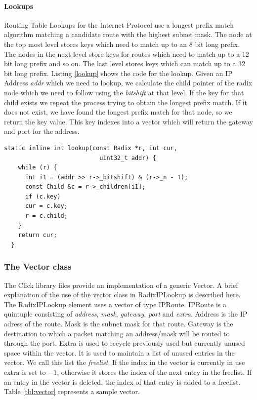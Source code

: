 \documentclass[a4paper,marginparwidth=50pt,marginparsep=10pt]{article}
\begin{document}
\paragraph{Lookups}
Routing Table Lookups for the Internet Protocol use a longest prefix match algorithm matching a candidate route with the highest subnet mask. The node at the top most level stores keys which need to match up to an 8 bit long prefix. The nodes in the next level store keys for routes which need to match up to a $12$ bit long prefix and so on. The last level stores keys which can match up to a $32$ bit long prefix. Listing \ref{lookup} shows the code for the lookup. Given an IP Address \emph{addr} which we need to lookup, we calculate the child pointer of the radix node which we need to follow using the \emph{bitshift} at that level. If the key for that child exists we repeat the process trying to obtain the longest prefix match. If it does not exist, we have found the longest prefix match for that node, so we return the key value. This key indexes into a vector which will return the gateway and port for the address.
\begin{lstlisting}[caption = The lookup function, label=lookup]
  static inline int lookup(const Radix *r, int cur, 
                           uint32_t addr) {
    while (r) {
      int i1 = (addr >> r->_bitshift) & (r->_n - 1);
      const Child &c = r->_children[i1];
      if (c.key)
      cur = c.key;
      r = c.child;
    }
    return cur;
  }
\end{lstlisting}
\subsubsection{The Vector class}
The Click library files provide an implementation of a generic Vector. A brief explanation of the use of the vector class in RadixIPLookup is described here. The RadixIPLookup element uses a vector of type IPRoute. IPRoute is a quintuple consisting of \emph{address}, \emph{mask}, \emph{gateway}, \emph{port} and \emph{extra}. Address is the IP adress of the route. Mask is the subnet mask for that route. Gateway is the destination to which a packet matching an address/mask will be routed to through the port. Extra is used to recycle previously used but currently unused space within the vector. It is used to maintain a list of unused entries in the vector. We call this list the \emph{freelist}. If the index in the vector is currently in use extra is set to $-1$, otherwise it stores the index of the next entry in the freelist. If an entry in the vector is deleted, the index of that entry is added to a freelist. Table \ref{tbl:vector} represents a sample vector.
\end{document}
